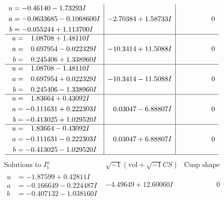 \documentclass[1p]{elsarticle_modified}
\theoremstyle{definition}
\newcommand{\I}{\sqrt{-1}}
\begin{document}
$$\begin{array}{c|c|c}
\begin{aligned}
u &= -0.46140 - 1.73293 I \\
a &= -0.0633685 - 0.1068600 I \\
b &= -0.055244 + 1.113700 I\end{aligned}
 & -2.70384 + 1.58733 I & \phantom{-0.000000 } 0 \\ \hline\begin{aligned}
u &= \phantom{-}1.08708 + 1.48110 I \\
a &= \phantom{-}0.697954 - 0.022329 I \\
b &= \phantom{-}0.245406 + 1.338960 I\end{aligned}
 & -10.3414 + 11.5088 I & \phantom{-0.000000 } 0 \\ \hline\begin{aligned}
u &= \phantom{-}1.08708 - 1.48110 I \\
a &= \phantom{-}0.697954 + 0.022329 I \\
b &= \phantom{-}0.245406 - 1.338960 I\end{aligned}
 & -10.3414 - 11.5088 I & \phantom{-0.000000 } 0 \\ \hline\begin{aligned}
u &= \phantom{-}1.83664 + 0.43092 I \\
a &= -0.111631 + 0.222303 I \\
b &= -0.413025 + 1.029520 I\end{aligned}
 & \phantom{-}0.03047 - 6.88807 I & \phantom{-0.000000 } 0 \\ \hline\begin{aligned}
u &= \phantom{-}1.83664 - 0.43092 I \\
a &= -0.111631 - 0.222303 I \\
b &= -0.413025 - 1.029520 I\end{aligned}
 & \phantom{-}0.03047 + 6.88807 I & \phantom{-0.000000 } 0\\
 \hline 
 \end{array}$$\newpage$$\begin{array}{c|c|c}  
\text{Solutions to }I^u_{1}& \I (\text{vol} + \sqrt{-1}CS) & \text{Cusp shape}\\
 \hline 
\begin{aligned}
u &= -1.87599 + 0.42811 I \\
a &= -0.166649 - 0.224487 I \\
b &= -0.407132 - 1.038160 I\end{aligned}
 & -4.49649 + 12.60060 I & \phantom{-0.000000 } 0 \\ \hline\begin{aligned}

\end{aligned}
\end{array}$$
\end{document}
